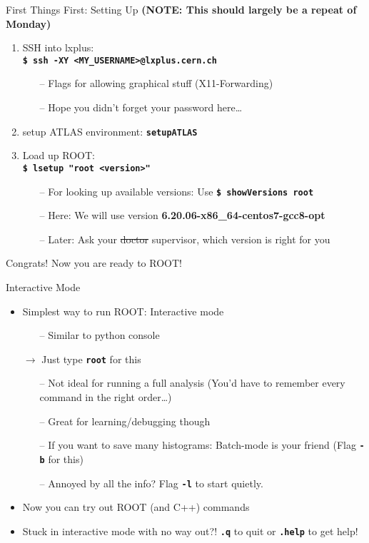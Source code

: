 \documentclass[10pt, aspectratio=169]{beamer}
\begin{document}
\begin{frame}{First Things First: Setting Up}
  \footnotesize\textbf{(NOTE: This should largely be a repeat of Monday)}
  \normalsize
  \begin{enumerate}
    \item
      SSH into lxplus: \\ \textbf{\texttt{\$ ssh -XY <MY\_USERNAME>@lxplus.cern.ch}}
    \begin{itemize}
      \item[--] Flags for allowing graphical stuff (X11-Forwarding)
      \item[--] Hope you didn't forget your password here\ldots
    \end{itemize}
    \item
      setup ATLAS environment: \textbf{\texttt{setupATLAS}}
    \item
      Load up ROOT: \\ \textbf{\texttt{\$ lsetup "root <version>"}}
    \begin{itemize}
      \item[--] For looking up available versions: Use \textbf{\texttt{\$ showVersions root}}
      \item[--] Here: We will use version \textbf{6.20.06-x86\_64-centos7-gcc8-opt}
      \item[--] Later: Ask your \sout{doctor} supervisor, which version is right for you
    \end{itemize}
  \end{enumerate}
  \large Congrats! Now you are ready to ROOT!
\end{frame}

\begin{frame}{Interactive Mode}
  \begin{itemize}
    \item
      Simplest way to run ROOT: Interactive mode
    \begin{itemize}
      \item[--] Similar to python console
    \end{itemize}
    \item[$\rightarrow$]
      Just type \textbf{\texttt{root}} for this
    \begin{itemize}
      \item[--] Not ideal for running a full analysis (You'd have to remember every command in the right order\ldots)
      \item[--] Great for learning/debugging though
      \item[--] If you want to save many histograms: Batch-mode is your friend (Flag \textbf{\texttt{-b}} for this)
      \item[--] Annoyed by all the info? Flag \textbf{\texttt{-l}} to start quietly.
    \end{itemize}
    \item
      Now you can try out ROOT (and C++) commands
    \item
      Stuck in interactive mode with no way out?! \textbf{\texttt{.q}} to quit or \textbf{\texttt{.help}} to get help!
  \end{itemize}
\end{frame}
\end{document}
